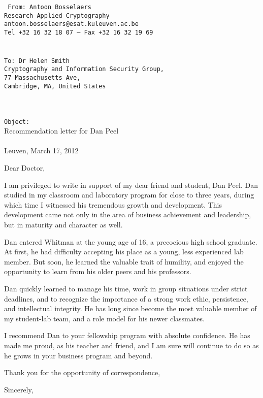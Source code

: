 \documentclass[a4paper,11pt]{article}
\begin{document}
\begin{multicols}{2}
\hfill\vfill
\columnbreak
{\tt
From: Antoon Bosselaers\\
Research Applied Cryptography\\
antoon.bosselaers@esat.kuleuven.ac.be\\
Tel +32 16 32 18 07 — Fax +32 16 32 19 69
\\\\\\
To: Dr Helen Smith\\
Cryptography and Information Security Group,\\
77 Massachusetts Ave,\\
Cambridge, MA, United States
\\\\\\
}
\end{multicols}

\begin{multicols}{2}
{\tt Object:}\\ 
Recommendation letter for Dan Peel
\\\\
Leuven, March 17, 2012
\end{multicols}

Dear Doctor, 

I am privileged to write in support of my dear friend and student, Dan Peel. Dan studied in my classroom and
laboratory program for close to three years, during which time I witnessed his tremendous growth and development. This
development came not only in the area of business achievement and leadership, but in maturity and character as well.

Dan entered Whitman at the young age of 16, a precocious high school graduate. At first, he had difficulty accepting his
place as a young, less experienced lab member. But soon, he learned the valuable trait of humility, and enjoyed the
opportunity to learn from his older peers and his professors.

Dan quickly learned to manage his time, work in group situations under strict deadlines, and to recognize the importance
of a strong work ethic, persistence, and intellectual integrity. He has long since become the most valuable member of
my student-lab team, and a role model for his newer classmates.

I recommend Dan to your fellowship program with absolute confidence. He has made me proud, as his teacher and friend,
and I am sure will continue to do so as he grows in your business program and beyond.

Thank you for the opportunity of correspondence,

Sincerely,
\end{document}
